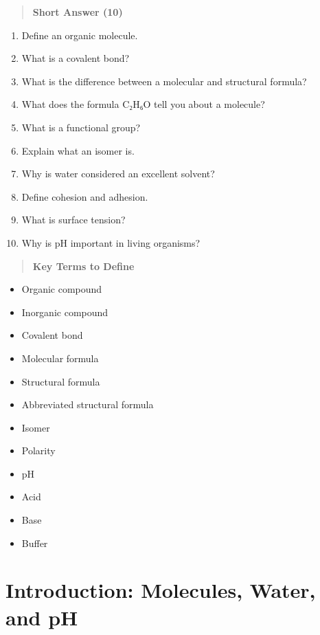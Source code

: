 \documentclass[
  letterpaper,
  DIV=11,
  numbers=noendperiod]{scrreprt}
\begin{document}
\begin{quote}
\textbf{Short Answer (10)}
\end{quote}

\begin{enumerate}
\def\labelenumi{\arabic{enumi}.}
\setcounter{enumi}{10}
\item
  Define an organic molecule.
\item
  What is a covalent bond?
\item
  What is the difference between a molecular and structural formula?
\item
  What does the formula C₂H₆O tell you about a molecule?
\item
  What is a functional group?
\item
  Explain what an isomer is.
\item
  Why is water considered an excellent solvent?
\item
  Define cohesion and adhesion.
\item
  What is surface tension?
\item
  Why is pH important in living organisms?
\end{enumerate}

\begin{quote}
\textbf{Key Terms to Define}
\end{quote}

\begin{itemize}
\item
  Organic compound
\item
  Inorganic compound
\item
  Covalent bond
\item
  Molecular formula
\item
  Structural formula
\item
  Abbreviated structural formula
\item
  Isomer
\item
  Polarity
\item
  pH
\item
  Acid
\item
  Base
\item
  Buffer
\end{itemize}

\section{\texorpdfstring{\textbf{Introduction: Molecules, Water, and
pH}}{Introduction: Molecules, Water, and pH}}\label{introduction-molecules-water-and-ph}
\end{document}
